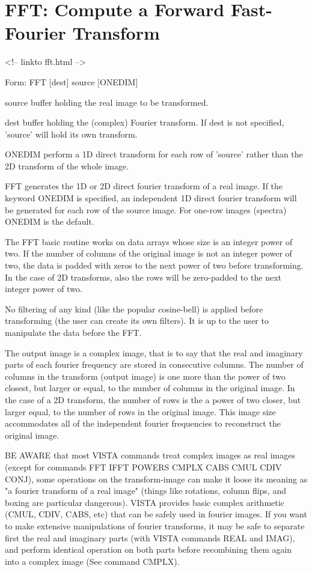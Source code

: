 \section{FFT: Compute a Forward Fast-Fourier Transform}
\begin{rawhtml}
<!-- linkto fft.html -->
\end{rawhtml}
\begin{command}
  \item[Form: FFT  {[dest]} source {[ONEDIM]}\hfill]{}
  \item[source]{buffer holding the real image to be transformed.}
  \item[dest]{buffer holding the (complex) Fourier transform. If dest
       is not specified, 'source' will hold its own transform.}
  \item[ONEDIM]{perform a 1D direct transform for each row of 'source'
       rather than the 2D transform of the whole image.}
\end{command}

FFT generates the 1D or 2D direct fourier transform of a real image. If the
keyword ONEDIM is specified, an independent 1D direct fourier transform
will be generated for each row of the source image. For one-row images
(spectra) ONEDIM is the default.

The FFT basic routine works on data arrays whose size is an integer power
of two. If the number of columns of the original image is not an integer
power of two, the data is padded with zeros to the next power of two before
transforming. In the case of 2D transforms, also the rows will be
zero-padded to the next integer power of two.

No filtering of any kind (like the popular cosine-bell) is applied before
transforming (the user can create its own filters). It is up to the user to
manipulate the data before the FFT.

The output image is a complex image, that is to say that the real and
imaginary parts of each fourier frequency are stored in consecutive
columns. The number of columns in the transform (output image) is one more
than the power of two closest, but larger or equal, to the number of
columns in the original image. In the case of a 2D transform, the number of
rows is the a power of two closer, but larger equal, to the number of rows
in the original image. This image size accommodates all of the independent
fourier frequencies to reconstruct the original image.

BE AWARE that most VISTA commands treat complex images as real images
(except for commands FFT IFFT POWERS CMPLX CABS CMUL CDIV CONJ), some
operations on the transform-image can make it loose its meaning as "a
fourier transform of a real image" (things like rotations, column flips,
and boxing are particular dangerous). VISTA provides basic complex
arithmetic (CMUL, CDIV, CABS, etc) that can be safely used in fourier
images. If you want to make extensive manipulations of fourier transforms,
it may be safe to separate first the real and imaginary parts (with VISTA
commands REAL and IMAG), and perform identical operation on both parts
before recombining them again into a complex image (See command CMPLX).

